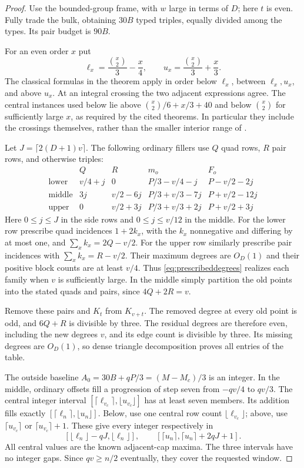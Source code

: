\documentclass[11pt]{article}
\begin{document}
\begin{proof}
Use the bounded-group frame, with $w$ large in terms of $D$; here $t$ is even.
Fully trade the bulk, obtaining $30B$ typed triples, equally divided
among the types. Its pair budget is $90B$.

For an even order $x$ put
\[
 \ell_x=\frac{\binom x2}{3}-\frac x4,
 \qquad u_x=\frac{\binom x2}{3}+\frac x3.
\]
The classical formulas in the theorem apply in order below $\ell_x$,
between $\ell_x,u_x$, and above $u_x$. At an integral crossing the two
adjacent expressions agree. The central instances used below lie above
$\binom{x}{2}/6+x/3+40$ and below $\binom{x}{2}$ for sufficiently large
$x$, as required by the cited theorems. In particular they include the
crossings themselves, rather than the smaller interior range of
\cite[Theorem 1.3]{chm-unbalanced}.

Let $J=\lceil2(D+1)v\rceil$. The following ordinary fillers use $Q$ quad
rows, $R$ pair rows, and otherwise triples:
\[
\begin{array}{c|c|c|c|c}
 &Q&R&m_o&F_o\\ \hline
\text{lower}&v/4+j&0&P/3-v/4-j&P-v/2-2j\\
\text{middle}&3j&v/2-6j&P/3+v/3-7j&P+v/2-12j\\
\text{upper}&0&v/2+3j&P/3+v/3+2j&P+v/2+3j
\end{array}
\]
Here $0\le j\le J$ in the side rows and $0\le j\le v/12$ in the middle.
For the lower row prescribe quad incidences $1+2k_x$, with the $k_x$
nonnegative and differing by at most one, and
$\sum_x k_x=2Q-v/2$. For the upper row similarly prescribe pair
incidences with $\sum_xk_x=R-v/2$.
Their maximum degrees are $O_D(1)$ and their positive block counts are
at least $v/4$. Thus \eqref{eq:prescribeddegrees} realizes each family
when $v$ is sufficiently large. In the middle simply partition the old
points into the stated quads and pairs, since $4Q+2R=v$.

Remove these pairs and $K_t$ from $K_{v+t}$. The removed degree at every
old point is odd, and $6Q+R$ is divisible by three. The residual degrees
are therefore even, including the new degrees $v$, and its edge count
is divisible by three. Its missing degrees are $O_D(1)$, so dense triangle
decomposition proves all entries of the table.

The outside baseline $A_0=30B+qP/3=(M-M_c)/3$ is an integer.
In the middle, ordinary offsets fill a progression of step seven from
$-qv/4$ to $qv/3$. The central integer interval
$[\lceil\ell_{v_c}\rceil,\lfloor u_{v_c}\rfloor]$ has at least seven
members. Its addition fills exactly
$[\lceil\ell_n\rceil,\lfloor u_n\rfloor]$.
Below, use one central row count $\lfloor\ell_{v_c}\rfloor$;
above, use $\lceil u_{v_c}\rceil$ or $\lceil u_{v_c}\rceil+1$.
These give every integer respectively in
\[
 [\lfloor\ell_n\rfloor-qJ,\lfloor\ell_n\rfloor],
 \qquad
 [\lceil u_n\rceil,\lceil u_n\rceil+2qJ+1].
\]
All central values are the known adjacent-cap maxima.
The three intervals have no integer gaps. Since $qv\ge n/2$ eventually,
they cover the requested window.


\end{proof}
\end{document}
